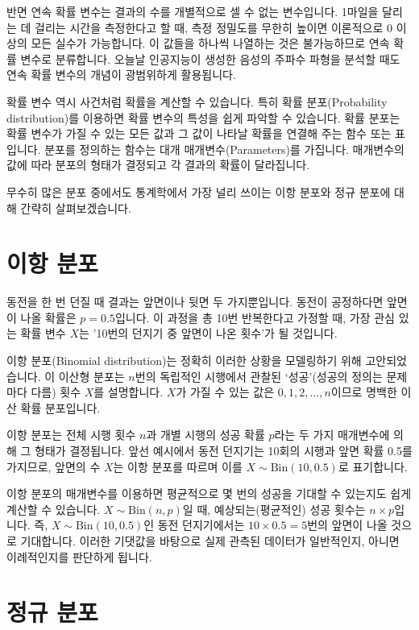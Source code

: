 \documentclass[
]{scrbook}
\begin{document}
반면 연속 확률 변수는 결과의 수를 개별적으로 셀 수 없는 변수입니다.
1마일을 달리는 데 걸리는 시간을 측정한다고 할 때, 측정 정밀도를 무한히
높이면 이론적으로 0 이상의 모든 실수가 가능합니다. 이 값들을 하나씩
나열하는 것은 불가능하므로 연속 확률 변수로 분류합니다. 오늘날
인공지능이 생성한 음성의 주파수 파형을 분석할 때도 연속 확률 변수의
개념이 광범위하게 활용됩니다.

확률 변수 역시 사건처럼 확률을 계산할 수 있습니다. 특히 확률
분포(Probability distribution)를 이용하면 확률 변수의 특성을 쉽게 파악할
수 있습니다. 확률 분포는 확률 변수가 가질 수 있는 모든 값과 그 값이
나타날 확률을 연결해 주는 함수 또는 표입니다. 분포를 정의하는 함수는
대개 매개변수(Parameters)를 가집니다. 매개변수의 값에 따라 분포의 형태가
결정되고 각 결과의 확률이 달라집니다.

무수히 많은 분포 중에서도 통계학에서 가장 널리 쓰이는 이항 분포와 정규
분포에 대해 간략히 살펴보겠습니다.

\section{이항 분포}\label{uxc774uxd56d-uxbd84uxd3ec}

동전을 한 번 던질 때 결과는 앞면이나 뒷면 두 가지뿐입니다. 동전이
공정하다면 앞면이 나올 확률은 \(p=0.5\)입니다. 이 과정을 총 10번
반복한다고 가정할 때, 가장 관심 있는 확률 변수 \(X\)는 '10번의 던지기 중
앞면이 나온 횟수'가 될 것입니다.

이항 분포(Binomial distribution)는 정확히 이러한 상황을 모델링하기 위해
고안되었습니다. 이 이산형 분포는 \(n\)번의 독립적인 시행에서 관찰된
`성공'(성공의 정의는 문제마다 다름) 횟수 \(X\)를 설명합니다. \(X\)가
가질 수 있는 값은 \(0, 1, 2, \dots, n\)이므로 명백한 이산 확률
분포입니다.

이항 분포는 전체 시행 횟수 \(n\)과 개별 시행의 성공 확률 \(p\)라는 두
가지 매개변수에 의해 그 형태가 결정됩니다. 앞선 예시에서 동전 던지기는
10회의 시행과 앞면 확률 0.5를 가지므로, 앞면의 수 \(X\)는 이항 분포를
따르며 이를 \(X \sim \text{Bin}(10, 0.5)\)로 표기합니다.

이항 분포의 매개변수를 이용하면 평균적으로 몇 번의 성공을 기대할 수
있는지도 쉽게 계산할 수 있습니다. \(X \sim \text{Bin}(n, p)\)일 때,
예상되는(평균적인) 성공 횟수는 \(n \times p\)입니다. 즉,
\(X \sim \text{Bin}(10, 0.5)\)인 동전 던지기에서는
\(10 \times 0.5 = 5\)번의 앞면이 나올 것으로 기대합니다. 이러한 기댓값을
바탕으로 실제 관측된 데이터가 일반적인지, 아니면 이례적인지를 판단하게
됩니다.

\section{정규 분포}\label{uxc815uxaddc-uxbd84uxd3ec}
\end{document}
